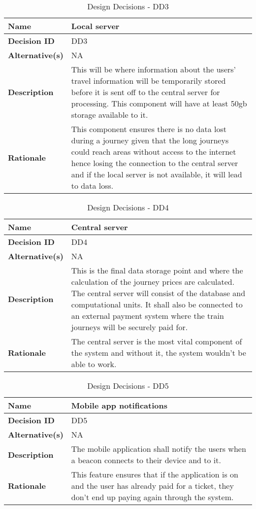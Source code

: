 \begin{table}[H]
	\centering
	\begin{tabularx}{\linewidth}{l|X}
		\textbf{Name}      & Local server\\ \hline
		\textbf{Decision ID}  & DD3 \\ \hline
		\textbf{Alternative(s)}     & NA \\ \hline
		\textbf{Description}   & This will be where information about the users' travel information will be temporarily stored before it is sent off to the central server for processing. This component will have at least 50gb storage available to it.\\ \hline
		\textbf{Rationale}    & This component ensures there is no data lost during a journey given that the long journeys could reach areas without access to the internet hence losing the connection to the central server and if the local server is not available, it will lead to data loss. \\ \hline
	\end{tabularx}
	\caption{Design Decisions - DD3}
	\label{tbl:DD3}
\end{table}

\begin{table}[H]
	\centering
	\begin{tabularx}{\linewidth}{l|X}
		\textbf{Name}      & Central server \\ \hline
		\textbf{Decision ID}  & DD4 \\ \hline
		\textbf{Alternative(s)}     & NA  \\ \hline
		\textbf{Description}   & This is the final data storage point and where the calculation of the journey prices are calculated. The central server will consist of the database and computational units. It shall also be connected to an external payment system where the train journeys will be securely paid for. \\ \hline
		\textbf{Rationale}    & The central server is the most vital component of the system and without it, the system wouldn't be able to work.  \\ \hline
	\end{tabularx}
	\caption{Design Decisions - DD4}
	\label{tbl:DD4}
\end{table}

\begin{table}[H]
	\centering
	\begin{tabularx}{\linewidth}{l|X}
		\textbf{Name}      & Mobile app notifications \\ \hline
		\textbf{Decision ID}  & DD5 \\ \hline
		\textbf{Alternative(s)}     & NA  \\ \hline
		\textbf{Description}   & The mobile application shall notify the users when a beacon connects to their device and to it.\\ \hline
		\textbf{Rationale}    & This feature ensures that if the application is on and the user has already paid for a ticket, they don't end up paying again through the system. \\ \hline
	\end{tabularx}
	\caption{Design Decisions - DD5}
	\label{tbl:DD5}
\end{table}

